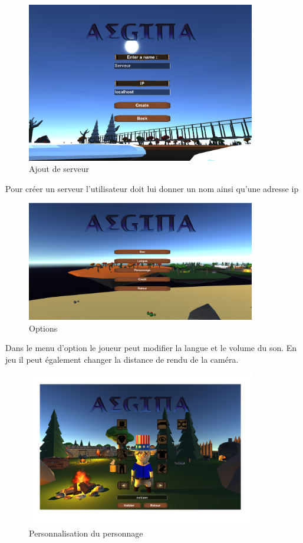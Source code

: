 \documentclass[12pt,a4paper]{article}
\begin{document}
\begin{figure}[h!]
\begin{center}\includegraphics[width=10cm]{res/CreationServeur} %
\caption{Ajout de serveur} 
\end{center}
\end{figure}

Pour créer un serveur l'utilisateur doit lui donner un nom ainsi qu'une adresse ip

\begin{figure}[h!]
\begin{center}\includegraphics[width=10cm]{res/Options} %
\caption{Options} 
\end{center}
\end{figure}

Dans le menu d'option le joueur peut modifier la langue et le volume du son. En jeu il peut également changer la distance de rendu de la caméra.

\pagebreak

\begin{figure}[h!]
\begin{center}\includegraphics[width=10cm]{res/Personnalisation} %
\caption{Personnalisation du personnage} 
\end{center}
\end{figure}
\end{document}
